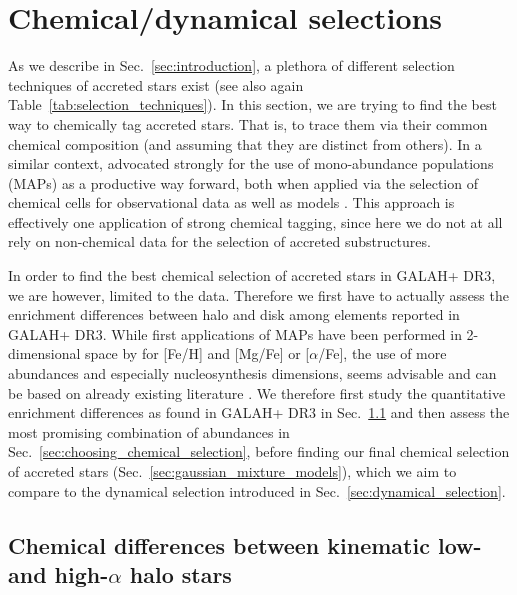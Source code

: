 \documentclass[fleqn,usenatbib]{mnras}
\begin{document}
\section{Chemical/dynamical selections} \label{sec:our_selection_techniques}

As we describe in Sec.~\ref{sec:introduction}, a plethora of different selection techniques of accreted stars exist (see also again Table~\ref{tab:selection_techniques}). In this section, we are trying to find the best way to chemically tag \citep{FreemanBlandHawthorn2002} accreted stars. That is, to trace them via their common chemical composition (and assuming that they are distinct from others). In a similar context, \citet{Rix2013} advocated strongly for the use of mono-abundance populations (MAPs) as a productive way forward, both when applied via the selection of chemical cells \citep{Lu2021} for observational data \citep[e.g.][]{Bovy2012, Bovy2012b, Bovy2016} as well as models \citep[e.g.][]{Bird2013, Minchev2017}. This approach is effectively one application of strong chemical tagging, since here we do not at all rely on non-chemical data for the selection of accreted substructures. 

In order to find the best chemical selection of accreted stars in GALAH+ DR3, we are however, limited to the data. Therefore we first have to actually assess the enrichment differences between halo and disk among elements reported in GALAH+ DR3. While first applications of MAPs have been performed in 2-dimensional space by \citet{Navarro2011,DiMatteo2019,Carollo2021} for [Fe/H] and [Mg/Fe] or [$\alpha$/Fe], the use of more abundances and especially nucleosynthesis dimensions, seems advisable and can be based on already existing literature \citep{Nissen2010,Nissen2011,Nissen2012, Nissen2014, Hawkins2015, Hayes2018, Das2020}. We therefore first study the quantitative enrichment differences as found in GALAH+ DR3 in Sec.~\ref{sec:enrichment_differences} and then assess the most promising combination of abundances in Sec.~\ref{sec:choosing_chemical_selection}, before finding our final chemical selection of accreted stars (Sec.~\ref{sec:gaussian_mixture_models}), which we aim to compare to the dynamical selection introduced in Sec.~\ref{sec:dynamical_selection}.

\subsection{Chemical differences between kinematic low- and high-$\alpha$ halo stars} \label{sec:enrichment_differences}
\end{document}
